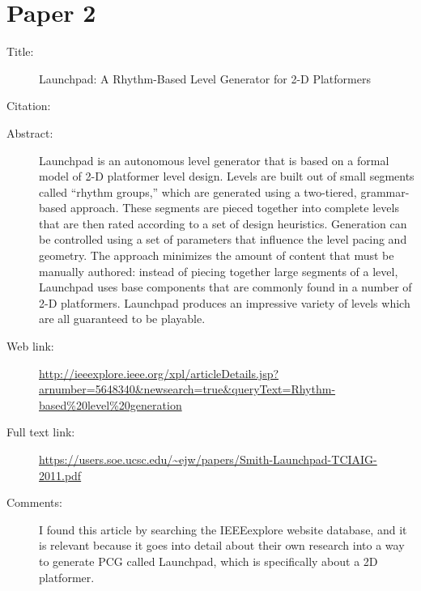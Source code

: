 \documentclass{scrartcl}
\begin{document}
\section*{Paper 2}
\begin{description}
\item[Title:] Launchpad: A Rhythm-Based Level Generator
for 2-D Platformers
\item[Citation:] \cite{smith2009}
\item[Abstract:] Launchpad is an autonomous level generator that is
based on a formal model of 2-D platformer level design. Levels are
built out of small segments called “rhythm groups,” which are generated
using a two-tiered, grammar-based approach. These segments
are pieced together into complete levels that are then rated
according to a set of design heuristics. Generation can be controlled
using a set of parameters that influence the level pacing and geometry.
The approach minimizes the amount of content that must be
manually authored: instead of piecing together large segments of a
level, Launchpad uses base components that are commonly found
in a number of 2-D platformers. Launchpad produces an impressive
variety of levels which are all guaranteed to be playable.

\item[Web link:] \url{http://ieeexplore.ieee.org/xpl/articleDetails.jsp?arnumber=5648340&newsearch=true&queryText=Rhythm-based%20level%20generation}
\item[Full text link:] \url{https://users.soe.ucsc.edu/~ejw/papers/Smith-Launchpad-TCIAIG-2011.pdf}
\item[Comments:] I found this article by searching the IEEEexplore website database, and it is relevant because it goes into detail about their own research into a way to generate PCG called Launchpad, which is specifically about a 2D platformer.
\end{description}
\end{document}
